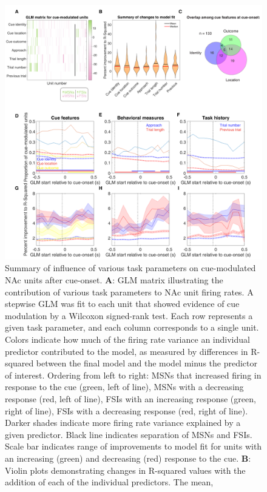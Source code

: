 \documentclass[11pt]{article}
\newcommand{\bsf}[1]{\textbf{#1}}
\begin{document}
 \begin{figure}[ht!]
\centering
\includegraphics[height=0.5\textheight]{Fig 5 - GLM.pdf}
\caption{Summary of influence of various task parameters on cue-modulated NAc
units after cue-onset. \bsf{A}: GLM matrix illustrating the contribution of
various task parameters to NAc unit firing rates. A stepwise GLM was fit to
each unit that showed evidence of cue modulation by a Wilcoxon signed-rank
test. Each row represents a given task parameter, and each column corresponds
to a single unit. Colors indicate how much of the firing rate variance an
individual predictor contributed to the model, as measured by differences in
R-squared between the final model and the model minus the predictor of
interest. Ordering from left to right: MSNs that increased firing in response
to the cue (green, left of line), MSNs with a decreasing response (red, left
of line), FSIs with an increasing response (green, right of line), FSIs with a
decreasing response (red, right of line). Darker shades indicate more firing
rate variance explained by a given predictor. Black line indicates separation
of MSNs and FSIs. Scale bar indicates range of improvements to model fit for units with an increasing (green) and decreasing (red) response to the cue. \bsf{B}: Violin plots demonstrating changes in R-squared
values with the addition of each of the individual predictors. The mean,
}
\end{figure}
\end{document}
